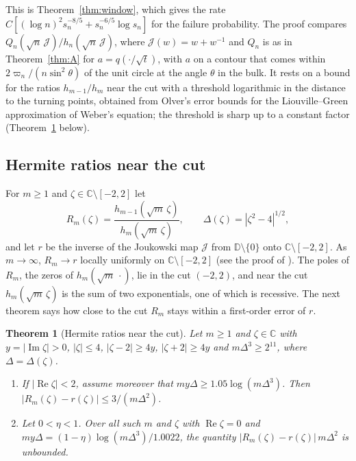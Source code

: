 \documentclass[11pt]{amsart}
\newtheorem{theorem}{Theorem}[section]
\theoremstyle{definition}
\theoremstyle{remark}
\numberwithin{equation}{section}
\newcommand{\C}{\mathbb{C}}
\newcommand{\D}{\mathbb{D}}
\DeclareMathOperator{\re}{Re}
\DeclareMathOperator{\im}{Im}
\begin{document}
This is Theorem~\ref{thm:window}, which gives the rate $C[(\log n)^2s_n^{-8/5}+s_n^{-6/5}\log s_n]$ for the failure probability. The proof compares $Q_n(\sqrt n\,\mathcal J)/h_n(\sqrt n\,\mathcal J)$, where $\mathcal J(w)=w+w^{-1}$ and $Q_n$ is as in Theorem~\ref{thm:A} for $a=q(\cdot/\sqrt t)$, with $a$ on a contour that comes within $2\varpi_n/(n\sin^2\theta)$ of the unit circle at the angle $\theta$ in the bulk. It rests on a bound for the ratios $h_{m-1}/h_m$ near the cut with a threshold logarithmic in the distance to the turning points, obtained from Olver's error bounds for the Liouville--Green approximation of Weber's equation; the threshold is sharp up to a constant factor (Theorem~\ref{thm:ratio-intro} below).

\subsection{Hermite ratios near the cut}\label{sec:intro-ratio}
For $m\ge1$ and $\zeta\in\C\setminus[-2,2]$ let
\[
R_m(\zeta)=\frac{h_{m-1}(\sqrt m\,\zeta)}{h_m(\sqrt m\,\zeta)},\qquad\Delta(\zeta)=|\zeta^2-4|^{1/2},
\]
and let $r$ be the inverse of the Joukowski map $\mathcal J$ from $\D\setminus\{0\}$ onto $\C\setminus[-2,2]$. As $m\to\infty$, $R_m\to r$ locally uniformly on $\C\setminus[-2,2]$ (see the proof of \cite[Proposition~\ref{M-prop:exterior}]{Main}). The poles of $R_m$, the zeros of $h_m(\sqrt m\,\cdot)$, lie in the cut $(-2,2)$, and near the cut $h_m(\sqrt m\,\zeta)$ is the sum of two exponentials, one of which is recessive. The next theorem says how close to the cut $R_m$ stays within a first-order error of $r$.

\begin{theorem}[Hermite ratios near the cut]\label{thm:ratio-intro}
Let $m\ge1$ and $\zeta\in\C$ with $y=|\im\zeta|>0$, $|\zeta|\le4$, $|\zeta-2|\ge4y$, $|\zeta+2|\ge4y$ and $m\Delta^3\ge2^{11}$, where $\Delta=\Delta(\zeta)$.
\begin{enumerate}
\item[(a)] If $|\re\zeta|<2$, assume moreover that $my\Delta\ge1.05\log(m\Delta^3)$. Then $|R_m(\zeta)-r(\zeta)|\le3/(m\Delta^2)$.
\item[(b)] Let $0<\eta<1$. Over all such $m$ and $\zeta$ with $\re\zeta=0$ and $my\Delta=(1-\eta)\log(m\Delta^3)/1.0022$, the quantity $|R_m(\zeta)-r(\zeta)|\,m\Delta^2$ is unbounded.
\end{enumerate}
\end{theorem}
\end{document}
